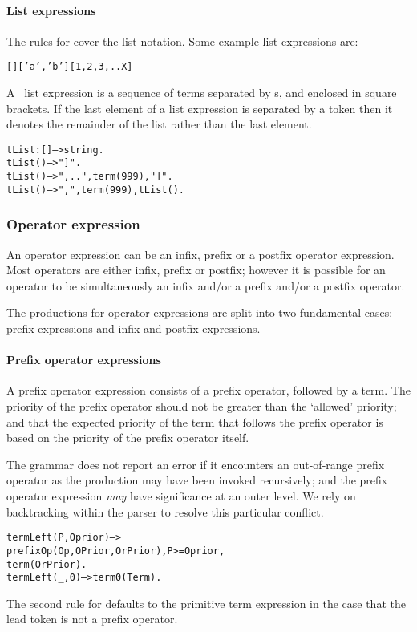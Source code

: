\paragraph{List expressions}
\label{grammar:lists}    
The rules for  cover the list notation. Some example list expressions are:
\begin{alltt}
[] ['a', 'b'] [1,2,3,..X]
\end{alltt}
A \go\ list expression is a sequence of terms separated by s, and enclosed in square brackets. If the last element of a list expression is separated by a  token then it denotes the remainder of the list rather than the last element.
\begin{alltt}
tList:[]-->string.
tList() --> "]".
tList() --> ",..", term(999), "]".
tList() --> ",", term(999), tList().
\end{alltt}

\subsubsection{Operator expression}
\label{grammar:operator-expression}
An operator expression can be an infix, prefix or a postfix operator expression. Most operators are either infix, prefix or postfix; however it is possible for an operator to be simultaneously an infix and/or a prefix and/or a postfix operator. 
     
The productions for operator expressions are split into two fundamental cases: prefix expressions and infix and postfix expressions.

\paragraph{Prefix operator expressions}
A prefix operator expression consists of a prefix operator, followed by a term. The priority of the prefix operator should not be greater than the `allowed' priority; and that the expected priority of the term that follows the prefix operator is based on the priority of the prefix operator itself.
	
The  grammar does not report an error if it encounters an out-of-range prefix operator as the  production may have been invoked recursively; and the prefix operator expression {\em may} have significance at an outer level. We rely on backtracking within the parser to resolve this particular conflict.
\begin{alltt}
termLeft(P,Oprior) -->
    prefixOp(Op,OPrior,OrPrior), P>=Oprior,
    term(OrPrior).
termLeft(_,0) --> term0(Term).
\end{alltt}
The second rule for  defaults to the primitive term expression in the case that the lead token is not a prefix operator.

